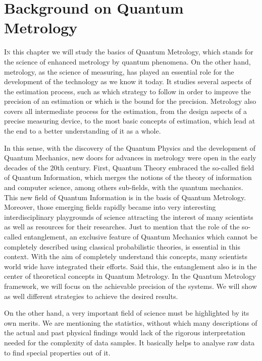 \section[Backgroud on Quantum Metrology]
{Background on Quantum Metrology}



\vspace{0pt}
\lettrine[lines=2, findent=3pt,nindent=0pt]{I}{n} this chapter we will study the basics of Quantum Metrology, which stands for the science of enhanced metrology by quantum phenomena.
On the other hand, metrology, as the science of measuring, has played an essential role for the development of the technology as we know it today.
It studies several aspects of the estimation process, such as which strategy to follow in order to improve the precision of an estimation or which is the bound for the precision.
Metrology also covers all intermediate process for the estimation, from the design aspects of a precise measuring device, to the most basic concepts of estimation, which lead at the end to a better understanding of it as a whole.

In this sense, with the discovery of the Quantum Physics and the development of Quantum Mechanics, new doors for advances in metrology were open in the early decades of the 20th century.
First, Quantum Theory embraced the so-called field of Quantum Information, which merges the notions of the theory of information and computer science, among others sub-fields, with the quantum mechanics.
This new field of Quantum Information is in the basis of Quantum Metrology.
Moreover, those emerging fields rapidly became into very interesting interdisciplinary playgrounds of science attracting the interest of many scientists as well as resources for their researches.
Just to mention that the role of the so-called entanglement, an exclusive feature of Quantum Mechanics which cannot be completely described using classical probabilistic theories, is essential in this context.
With the aim of completely understand this concepts, many scientists world wide have integrated their efforts.
Said this, the entanglement also is in the center of theoretical concepts in Quantum Metrology.
In the Quantum Metrology framework, we will focus on the achievable precision of the systems.
We will show as well different strategies to achieve the desired results.

On the other hand, a very important field of science must be highlighted by its own merits.
We are mentioning the statistics, without which many descriptions of the actual and past physical findings would lack of the rigorous interpretation needed for the complexity of data samples.
It basically helps to analyse raw data to find special properties out of it.

